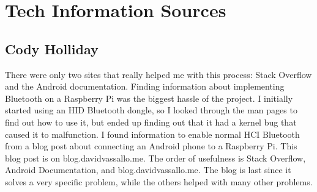 \section{Tech Information Sources}
\subsection{Cody Holliday}
There were only two sites that really helped me with this process: Stack Overflow and the Android documentation.
Finding information about implementing Bluetooth on a Raspberry Pi was the biggest hassle of the project.
I initially started using an HID Bluetooth dongle, so I looked through the man pages to find out how to use it, but ended up finding out that it had a kernel bug that caused it to malfunction.
I found information to enable normal HCI Bluetooth from a blog post about connecting an Android phone to a Raspberry Pi.
This blog post is on blog.davidvassallo.me.
The order of usefulness is Stack Overflow, Android Documentation, and blog.davidvassallo.me.
The blog is last since it solves a very specific problem, while the others helped with many other problems.
